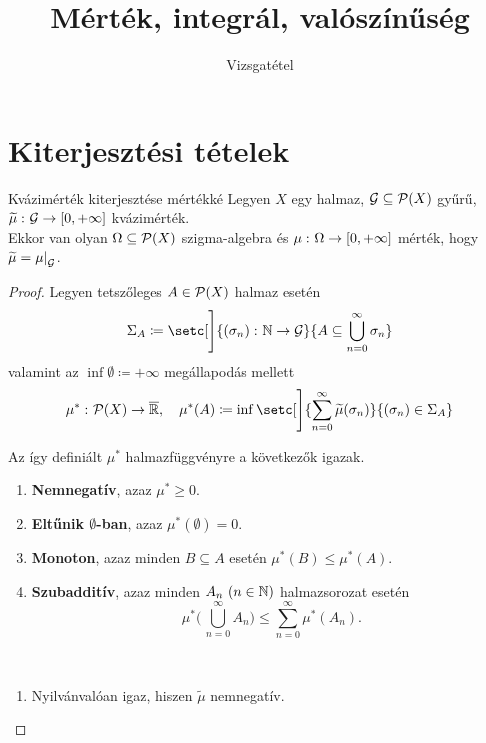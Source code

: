 \documentclass[
]{elteikthesis}[2024/04/26]
\title{Mérték, integrál, valószínűség} %
\subtitle{\circled{8} Vizsgatétel}
\begin{document}
	
	
	\section{Kiterjesztési tételek}
	
	\begin{theorem}{Kvázimérték kiterjesztése mértékké}{}
		Legyen \( X \) egy halmaz, 
		\( \mathcal{G} \subseteq \mathcal{P}( X ) \) gyűrű, 
		\( \widetilde{\mu}  \,\colon  \mathcal{G}  \to  [0, +\infty] \) kvázimérték.\\
		Ekkor van olyan \( \Omega \subseteq \mathcal{P}( X ) \) szigma-algebra és 
		\( \mu  \,\colon  \Omega  \to  [0, +\infty] \) mérték, 
		hogy \( \widetilde{\mu} = \restr{\mu}{\ring{G}} \).
	\end{theorem}
	\begin{proof}
		Legyen tetszőleges \( A \in \mathcal{P}( X ) \) halmaz esetén
		\[
			\Sigma_A \coloneq 
			\setc[\Bigg]{ \func{(\sigma_n)}{ \N }{ \ring{G} }}{ A \subseteq \bigcup_{n=0}^\infty \sigma_n }
		\]
		valamint az \( \inf \emptyset \coloneq +\infty \) megállapodás mellett
		\[
			\func{ \mu^* }{ \powerset{X} }{ \overline{\R} }, \quad
			\mu^*(A) \coloneq
			\inf \setc[\Bigg]{ \sum_{n=0}^{\infty} \widetilde{\mu}( \sigma_n ) }
                { (\sigma_n) \in \Sigma_A }
		\]
		\begin{tcolorbox}[colback=green!10, colframe=green!80]
			\begin{lem*}
				Az így definiált \( \mu^* \) halmazfüggvényre a következők igazak.
				\begin{enumerate}
					\item 
					\textbf{Nemnegatív}, azaz \( \mu^* \geq 0 \).
					
					\item 
					\textbf{Eltűnik \( \boldsymbol{\emptyset} \)-ban}, azaz
					\( \mu^*(\emptyset) = 0 \).
					
					\item 
					\textbf{Monoton}, 
					azaz minden \( B \subseteq A \) esetén \( \mu^*(B) \leq \mu^*(A) \).
					
					\item\label{eq:mu-csillag-szubadditív}
					\textbf{Szubadditív}, 
					azaz minden \( A_n \ (n \in \mathbb{N} ) \) halmazsorozat esetén
					\[
						\mu^* \Biggl( \, \bigcup\limits_{n=0}^\infty A_n \Biggr) \leq 
						\sum\limits_{n=0}^{\infty} \mu^*(A_n).
					\]
				\end{enumerate}
			\end{lem*}
		\end{tcolorbox}
		\begin{proof*}\,
			\begin{enumerate}
				\item 
				Nyilvánvalóan igaz, hiszen \( \widetilde{\mu} \) nemnegatív.
				

\end{enumerate}
\end{proof*}
\end{proof}
\end{document}
